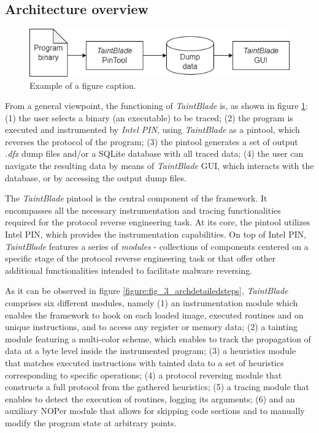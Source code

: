 \documentclass[conference]{IEEEtran}
\begin{document}
\subsection{Architecture overview}

\begin{figure}[htbp]
    \centerline{\includegraphics[width=0.9\columnwidth]{images/generalarch.drawio.png}}
    \caption{Example of a figure caption.}
    \label{fig_3_generalarch}
\end{figure}

From a general viewpoint, the functioning of \textit{TaintBlade} is, as shown
in figure \ref{fig_3_generalarch}: (1) the user selects a binary (an
executable) to be traced; (2) the program is executed and instrumented by
\textit{Intel PIN}, using \textit{TaintBlade} as a pintool, which reverses the
protocol of the program; (3) the pintool generates a set of output
\textit{.dfx} dump files and/or a SQLite database with all traced data; (4) the
user can navigate the resulting data by means of \textit{TaintBlade} GUI, which
interacts with the database, or by accessing the output dump files.

The \textit{TaintBlade} pintool is the central component of the framework. It
encompasses all the necessary instrumentation and tracing functionalities
required for the protocol reverse engineering task. At its core, the pintool
utilizes Intel PIN, which provides the instrumentation capabilities. On top of
Intel PIN, \textit{TaintBlade} features a series of \textit{modules} -
collections of components centered on a specific stage of the protocol reverse
engineering task or that offer other additional functionalities intended to
facilitate malware reversing.

As it can be observed in figure \ref{figure:fig_3_archdetailedsteps},
\textit{TaintBlade} comprises six different modules, namely (1) an
instrumentation module which enables the framework to hook on each loaded
image, executed routines and on unique instructions, and to access any register
or memory data; (2) a tainting module featuring a multi-color scheme, which
enables to track the propagation of data at a byte level inside the
instrumented program; (3) a heuristics module that matches executed
instructions with tainted data to a set of heuristics corresponding to specific
operations; (4) a protocol reversing module that constructs a full protocol
from the gathered heuristics; (5) a tracing module that enables to detect the
execution of routines, logging its arguments; (6) and an auxiliary NOPer module
that allows for skipping code sections and to manually modify the program state
at arbitrary points.
\end{document}
